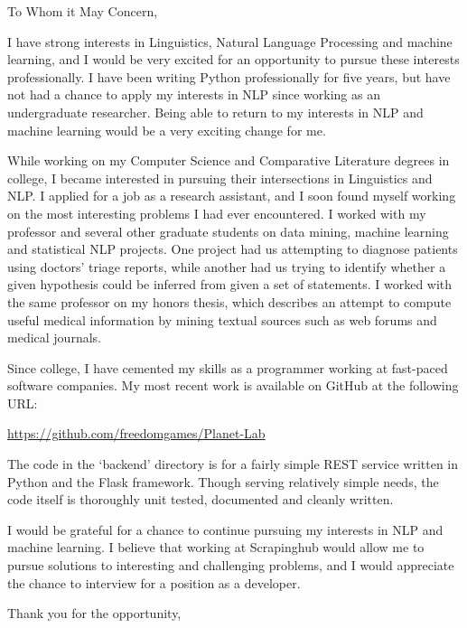 \documentclass{letter}
\begin{document}
\signature{Walter Askew\\
1221 Washtenaw Apt 3R\\
Chicago, IL 60622}

\begin{letter}{}

\opening{To Whom it May Concern,}

I have strong interests in Linguistics, Natural Language
Processing and machine learning, and I would be very excited for an
opportunity to pursue these interests professionally.
I have been writing Python professionally for five years, but have not
had a chance to apply my interests in NLP since working as an
undergraduate researcher.
Being able to return to my interests in NLP and machine learning would
be a very exciting change for me.

While working on my Computer Science and Comparative Literature
degrees in college, I became interested in pursuing their intersections
in Linguistics and NLP.
I applied for a job as a research assistant, and I soon found myself
working on the most interesting problems I had ever encountered.
I worked with my professor and several other graduate students on data
mining, machine learning and statistical NLP projects.
One project had us attempting to diagnose patients using doctors'
triage reports, while another had us trying to identify whether a
given hypothesis could be inferred from given a set of statements.
I worked with the same professor on my honors thesis, which describes
an attempt to compute useful medical information by mining textual
sources such as web forums and medical journals.

Since college, I have cemented my skills as a programmer working at
fast-paced software companies.
My most recent work is available on GitHub at the following URL:

\href{https://github.com/freedomgames/Planet-Lab}
     {https://github.com/freedomgames/Planet-Lab}

The code in the `backend' directory is for a fairly simple REST
service written in Python and the Flask framework.
Though serving relatively simple needs, the code itself is
thoroughly unit tested, documented and cleanly written.

I would be grateful for a chance to continue pursuing my interests in
NLP and machine learning.
I believe that working at Scrapinghub would allow me to pursue
solutions to interesting and challenging problems, and I would
appreciate the chance to interview for a position as a developer.

\closing{Thank you for the opportunity,}
\end{letter}
\end{document}
